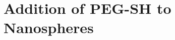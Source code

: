 
\def\mytitle{Chapter 3}

\def\bibliocommand{}
\chapter{Addition of PEG-SH to Nanospheres}
\label{additionofpeg-shtonanospheres}






